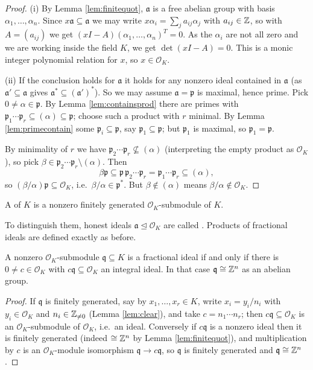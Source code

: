 \documentclass[a4paper]{scrartcl}
\renewcommand{\OO}{\mathcal{O}}
\newcommand{\fa}{\mathfrak{a}}
\newcommand{\fp}{\mathfrak{p}}
\newcommand{\fq}{\mathfrak{q}}
\begin{document}
\begin{proof}
	(i) By Lemma \ref{lem:finitequot}, $\fa$ is a free abelian group with basis $\alpha_1, \dots, \alpha_n$. Since $x\fa \subseteq \fa$ we may write $x\alpha_i = \sum_j a_{ij}\alpha_j$ with $a_{ij} \in \mathbb{Z}$, so with $A = (a_{ij})$ we get $(xI - A)(\alpha_1,\dots,\alpha_n)^T = 0$. As the $\alpha_i$ are not all zero and we are working inside the field $K$, we get $\det(xI-A) = 0$. This is a monic integer polynomial relation for $x$, so $x \in \OO_K$.

	(ii) If the conclusion holds for $\fa$ it holds for any nonzero ideal contained in $\fa$ (as $\fa' \subseteq \fa$ gives $\fa^* \subseteq (\fa')^*$). So we may assume $\fa = \fp$ is maximal, hence prime. Pick $0 \neq \alpha \in \fp$. By Lemma \ref{lem:containsprod} there are primes with $\fp_1\cdots\fp_r \subseteq (\alpha) \subseteq \fp$; choose such a product with $r$ minimal. By Lemma \ref{lem:primecontain} some $\fp_i \subseteq \fp$, say $\fp_1 \subseteq \fp$; but $\fp_1$ is maximal, so $\fp_1 = \fp$.

	By minimality of $r$ we have $\fp_2\cdots\fp_r \not\subseteq (\alpha)$ (interpreting the empty product as $\OO_K$), so pick $\beta \in \fp_2\cdots\fp_r \setminus (\alpha)$. Then
	$$\beta\fp \subseteq \fp\,\fp_2\cdots\fp_r = \fp_1\cdots\fp_r \subseteq (\alpha),$$
	so $(\beta/\alpha)\fp \subseteq \OO_K$, i.e.\ $\beta/\alpha \in \fp^*$. But $\beta \notin (\alpha)$ means $\beta/\alpha \notin \OO_K$.
\end{proof}

\begin{definition}
	A  of $K$ is a nonzero finitely generated $\OO_K$-submodule of $K$.
\end{definition}

To distinguish them, honest ideals $\fa \trianglelefteq \OO_K$ are called . Products of fractional ideals are defined exactly as before.

\begin{lemma}\label{lem:fracclear}
	A nonzero $\OO_K$-submodule $\fq \subseteq K$ is a fractional ideal if and only if there is $0 \neq c \in \OO_K$ with $c\fq \subseteq \OO_K$ an integral ideal. In that case $\fq \cong \Z^n$ as an abelian group.
\end{lemma}

\begin{proof}
	If $\fq$ is finitely generated, say by $x_1, \dots, x_r \in K$, write $x_i = y_i/n_i$ with $y_i \in \OO_K$ and $n_i \in \mathbb{Z}_{\neq 0}$ (Lemma \ref{lem:clear}), and take $c = n_1\cdots n_r$; then $c\fq \subseteq \OO_K$ is an $\OO_K$-submodule of $\OO_K$, i.e.\ an ideal. Conversely if $c\fq$ is a nonzero ideal then it is finitely generated (indeed $\cong \mathbb{Z}^n$ by Lemma \ref{lem:finitequot}), and multiplication by $c$ is an $\OO_K$-module isomorphism $\fq \to c\fq$, so $\fq$ is finitely generated and $\fq \cong \Z^n$.
\end{proof}
\end{document}
